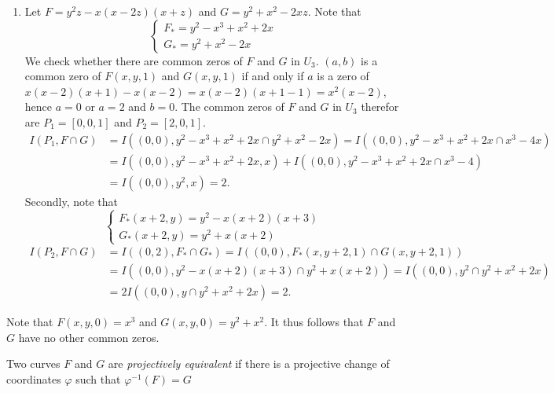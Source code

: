     \begin{example}
        \begin{enumerate}
            \item Let $F=y^2z-x(x-2z)(x+z)$ and $G= y^2+x^2-2xz$.
             Note that 
            $$
                \begin{cases}
                    F_\ast = y^2-x^3+x^2+2x\\
                    G_\ast = y^2+x^2-2x
                \end{cases}
            $$
            We check whether there are common zeros of $F$ and $G$ in $U_3$. $(a,b)$ is a common zero of $F(x,y,1)$ and $G(x,y,1)$ if and only if $a$ is a zero of $x(x-2)(x+1)-x(x-2) = x(x-2)(x+1-1)=x^2(x-2)$, hence $a=0$ or $a=2$ and $b=0$. The common zeros of $F$ and $G$ in $U_3$ therefor are $P_1=[0,0,1]$ and $P_2=[2,0,1]$.
            \begin{align*} 
                I(P_1, F\cap G)&= I((0,0),  y^2-x^3+x^2+2x\cap  y^2+x^2-2x) = I((0,0), y^2-x^3+x^2+2x\cap x^3-4x)\\
                &= I((0,0), y^2-x^3+x^2+2x, x) + I((0,0), y^2-x^3+x^2+2x\cap x^3-4)\\
                &= I((0,0), y^2,x)=2.
            \end{align*}
            Secondly, note that 
            $$
                \begin{cases}
                    F_\ast(x+2,y) = y^2-x(x+2)(x+3)\\
                    G_\ast(x+2,y)= y^2+x(x+2) 
                \end{cases}
            $$
            \begin{align*}
                I(P_2, F\cap G)&= I((0,2),F_\ast\cap G_\ast)=I((0,0),F_\ast(x,y+2,1)\cap G(x,y+2,1)) \\
                &= I((0,0), y^2-x(x+2)(x+3)\cap y^2+x(x+2)) = I((0,0), y^2\cap y^2+ x^2+2x)\\
                &= 2I((0,0),y\cap y^2+x^2+2x)= 2.
            \end{align*}
        \end{enumerate}
        Note that $F(x,y,0)=x^3$ and $G(x,y,0)=y^2+x^2$. It thus follows that $F$ and $G$ have no other common zeros. 
    \end{example}
    \begin{definition}
        Two curves $F$ and $G$ are \textit{projectively equivalent} if there is a projective change of coordinates $\varphi$ such that $\varphi^{-1}(F)=G$
    \end{definition}
